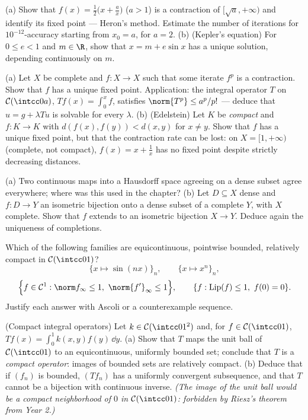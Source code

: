 \begin{exercise}[$\star\star$]\label{exo:b3:complete:3}
(a) Show that $f(x) = \frac12\bigl(x + \frac ax\bigr)$ ($a >
1$) is a contraction of $[\sqrt a, +\infty)$ and identify its
fixed point --- Heron's method. Estimate the number of
iterations for $10^{-12}$-accuracy starting from $x_0 = a$,
for $a = 2$.
(b) (Kepler's equation) For $0 \leq e < 1$ and $m \in \R$, show
that $x = m + e\sin x$ has a unique solution, depending
continuously on $m$.
\end{exercise}

\begin{exercise}[$\star\star$]\label{exo:b3:complete:4}
(a) Let $X$ be complete and $f \colon X \to X$ such that some
iterate $f^p$ is a contraction. Show that $f$ has a unique
fixed point. Application: the integral operator $T$ on
$\mathcal C(\intcc0a)$, $Tf(x) = \int_0^x f$, satisfies
$\norm{T^p} \leq a^p/p!$ --- deduce that $u = g + \lambda Tu$
is solvable for every $\lambda$.
(b) (Edelstein) Let $K$ be \emph{compact} and $f\colon K \to K$
with $d(f(x), f(y)) < d(x, y)$ for $x \neq y$. Show that $f$
has a unique fixed point, but that the contraction rate can be
lost: on $X = [1, +\infty)$ (complete, not compact), $f(x) = x
+ \frac1x$ has no fixed point despite strictly decreasing
distances.
\end{exercise}

\begin{exercise}[$\star\star$]\label{exo:b3:complete:5}
(a) Two continuous maps into a Hausdorff space agreeing on a
dense subset agree everywhere; where was this used in the
chapter?
(b) Let $D \subseteq X$ dense and $f \colon D \to Y$ an
isometric bijection onto a dense subset of a complete $Y$, with
$X$ complete. Show that $f$ extends to an isometric bijection
$X \to Y$. Deduce again the uniqueness of completions.
\end{exercise}

\begin{exercise}[$\star\star$]\label{exo:b3:complete:6}
Which of the following families are equicontinuous, pointwise
bounded, relatively compact in $\mathcal C(\intcc01)$?
\[
\{x \mapsto \sin(nx)\}_{n},\qquad
\{x \mapsto x^n\}_n,
\]
\[
\Bigl\{f \in \mathcal C^1 : \norm f_\infty \leq 1,\
\norm{f'}_\infty \leq 1\Bigr\},\qquad
\{f : \operatorname{Lip}(f)\leq 1,\ f(0) = 0\}.
\]
Justify each answer with Ascoli or a counterexample sequence.
\end{exercise}

\begin{exercise}[$\star\star\star$]\label{exo:b3:complete:7}
(Compact integral operators) Let $k \in \mathcal C(\intcc01^2)$
and, for $f \in \mathcal C(\intcc01)$, $Tf(x) =
\int_0^1k(x,y)f(y)\,\dd y$.
(a) Show that $T$ maps the unit ball of $\mathcal C(\intcc01)$
to an equicontinuous, uniformly bounded set; conclude that $T$
is a \emph{compact operator}: images of bounded sets are
relatively compact.
(b) Deduce that if $(f_n)$ is bounded, $(Tf_n)$ has a uniformly
convergent subsequence, and that $T$ cannot be a bijection with
continuous inverse. \emph{(The image of the unit ball would be
a compact neighborhood of $0$ in $\mathcal C(\intcc01)$:
forbidden by Riesz's theorem from Year 2.)}
\end{exercise}

